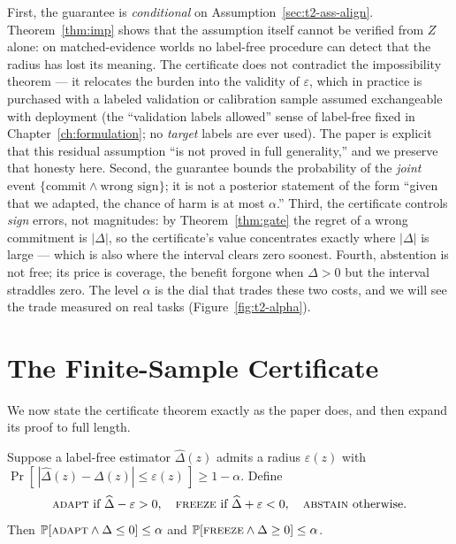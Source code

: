 \begin{remark}
\label{sec:t2-rem-meaning}
First, the guarantee is \emph{conditional} on
Assumption~\ref{sec:t2-ass-align}. Theorem~\ref{thm:imp} shows that the assumption
itself cannot be verified from $Z$ alone: on matched-evidence worlds no label-free
procedure can detect that the radius has lost its meaning. The certificate does not
contradict the impossibility theorem --- it relocates the burden into the validity of
$\varepsilon$, which in practice is purchased with a labeled validation or calibration
sample assumed exchangeable with deployment (the ``validation labels allowed'' sense of
label-free fixed in Chapter~\ref{ch:formulation}; no \emph{target} labels are ever
used). The paper is explicit that this residual assumption ``is not proved in full
generality,'' and we preserve that honesty here. Second, the guarantee bounds the
probability of the \emph{joint} event $\{\text{commit} \wedge \text{wrong sign}\}$; it
is not a posterior statement of the form ``given that we adapted, the chance of harm is
at most $\alpha$.'' Third, the certificate controls \emph{sign} errors, not magnitudes:
by Theorem~\ref{thm:gate} the regret of a wrong commitment is $|\Delta|$, so the
certificate's value concentrates exactly where $|\Delta|$ is large --- which is also
where the interval clears zero soonest. Fourth, abstention is not free; its price is
coverage, the benefit forgone when $\Delta>0$ but the interval straddles zero. The
level $\alpha$ is the dial that trades these two costs, and we will see the trade
measured on real tasks (Figure~\ref{fig:t2-alpha}).
\end{remark}

\section{The Finite-Sample Certificate}
\label{sec:t2-cert}

We now state the certificate theorem exactly as the paper does, and then expand its
proof to full length.

\begin{theorem}[Certificate]\label{thm:cert}
Suppose a label-free estimator $\widehat\Delta(z)$ admits a radius $\varepsilon(z)$ with
$\Pr[\,|\widehat\Delta(z)-\Delta(z)|\le \varepsilon(z)\,]\ge 1-\alpha$. Define
\[
\textsc{adapt}\ \text{if}\ \widehat\Delta-\varepsilon>0,\quad
\textsc{freeze}\ \text{if}\ \widehat\Delta+\varepsilon<0,\quad
\textsc{abstain}\ \text{otherwise.}
\]
Then $\Pr[\textsc{adapt}\wedge \Delta\le 0]\le\alpha$ and
$\Pr[\textsc{freeze}\wedge \Delta\ge 0]\le\alpha$.
\end{theorem}

